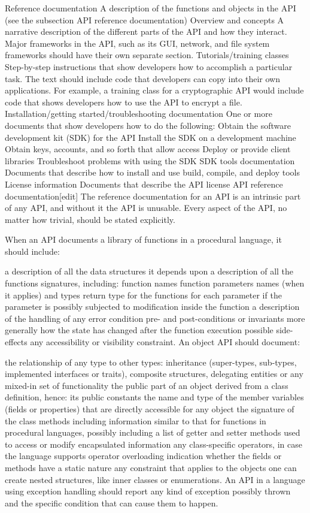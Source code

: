 Reference documentation 
A description of the functions and objects in the API (see the subsection API reference documentation)
Overview and concepts 
A narrative description of the different parts of the API and how they interact. 
Major frameworks in the API, such as its GUI, network, and file system frameworks should have their own separate section.
Tutorials/training classes 
Step-by-step instructions that show developers how to accomplish a particular task. 
The text should include code that developers can copy into their own applications. For example, a training class for a cryptographic API would include code that shows developers how to use the API to encrypt a file.
Installation/getting started/troubleshooting documentation 
One or more documents that show developers how to do the following:
Obtain the software development kit (SDK) for the API
Install the SDK on a development machine
Obtain keys, accounts, and so forth that allow access
Deploy or provide client libraries
Troubleshoot problems with using the SDK
SDK tools documentation 
Documents that describe how to install and use build, compile, and deploy tools
License information 
Documents that describe the API license
API reference documentation[edit]
The reference documentation for an API is an intrinsic part of any API, and without it the API is unusable. Every aspect of the API, no matter how trivial, should be stated explicitly.

When an API documents a library of functions in a procedural language, it should include:

a description of all the data structures it depends upon
a description of all the functions signatures, including:
function names
function parameters names (when it applies) and types
return type for the functions
for each parameter if the parameter is possibly subjected to modification inside the function
a description of the handling of any error condition
pre- and post-conditions or invariants
more generally how the state has changed after the function execution
possible side-effects
any accessibility or visibility constraint.
An object API should document:

the relationship of any type to other types: inheritance (super-types, sub-types, implemented interfaces or traits), composite structures, delegating entities or any mixed-in set of functionality
the public part of an object derived from a class definition, hence:
its public constants
the name and type of the member variables (fields or properties) that are directly accessible for any object
the signature of the class methods including information similar to that for functions in procedural languages, possibly including a list of getter and setter methods used to access or modify encapsulated information
any class-specific operators, in case the language supports operator overloading
indication whether the fields or methods have a static nature
any constraint that applies to the objects one can create
nested structures, like inner classes or enumerations.
An API in a language using exception handling should report any kind of exception possibly thrown and the specific condition that can cause them to happen.

